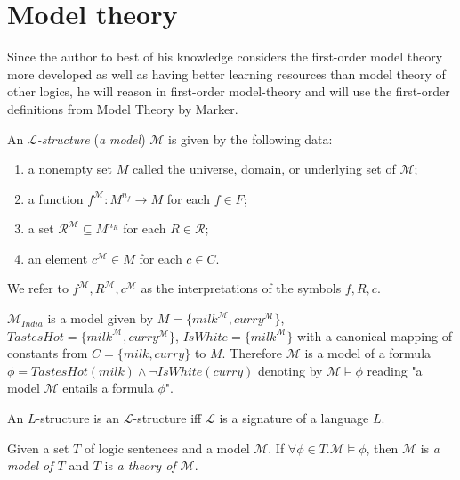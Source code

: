 \section{Model theory\cite{marker2002model}}
Since the author to best of his knowledge considers the first-order model theory more developed as well as having better learning resources than model theory  of other logics, he will reason in first-order model-theory and will use the first-order definitions from Model Theory by Marker\cite{marker2002model}.

\begin{defn}
An \emph{$\mathcal{L}$-structure} (\emph{a model}) $\mathcal{M}$ is given by the following data:
\begin{enumerate}
\item a nonempty set $M$ called the universe, domain, or underlying set of $\mathcal{M}$;
\item a function $f^{\mathcal{M}} : M^{n_f} \to M$ for each $f \in F$;
\item a set $\mathcal{R}^{\mathcal{M}} \subseteq M^{n_R}$ for each $R \in \mathcal{R}$;
\item an element $c^\mathcal{M} \in M$ for each $c \in C$.
\end{enumerate}
We refer to $f^\mathcal{M}, R^\mathcal{M}, c^\mathcal{M}$ as the interpretations of the symbols $f ,R, c$.
\end{defn}

\begin{exmp}
$\mathcal{M}_{India}$ is a model given by
$M=\{milk^\mathcal{M}, curry^\mathcal{M}\}$,
$TastesHot=\{milk^\mathcal{M}, curry^\mathcal{M}\}$,
$IsWhite=\{milk^\mathcal{M}\}$ with a canonical mapping of constants from
 $C=\{milk, curry\}$ to $M$. Therefore $\mathcal{M}$ is a model of a formula
$\phi=TastesHot(milk) \wedge \neg IsWhite(curry)$ denoting by
$\mathcal{M} \models \phi$ reading "a model $\mathcal{M}$ entails a formula $\phi$".
\end{exmp}

\begin{remark}
An $L$-structure is an $\mathcal{L}$-structure iff $\mathcal{L}$ is a signature of a language $L$.
\end{remark}

\begin{defn}
Given a set $T$ of logic sentences and a model $\mathcal{M}$. If $\forall \phi \in T. \mathcal{M} \models \phi$, then $\mathcal{M}$ is \emph{a model of $T$} and $T$ is \emph{a theory of $\mathcal{M}$}.
\end{defn}

